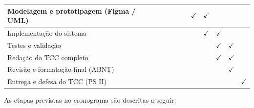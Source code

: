 \begin{table}[htb]
\begin{tabularx}{\textwidth}{|X|c|c|c|c|c|c|c|c|c|c|}
  Modelagem e prototipagem (Figma / UML)
  & & & & & & $\checkmark$ & $\checkmark$ & & & \\
  \hline

  Implementação do sistema
  & & & & & & & $\checkmark$ & $\checkmark$ & & \\
  \hline

  Testes e validação
  & & & & & & & & $\checkmark$ & $\checkmark$ & \\
  \hline


  Redação do TCC completo
  & & & & & & & & $\checkmark$ & $\checkmark$ & \\
  \hline

  Revisão e formatação final (ABNT)
  & & & & & & & & & $\checkmark$ & \\
  \hline

  Entrega e defesa do TCC (PS II)
  & & & & & & & & & & $\checkmark$ \\
  \hline

\end{tabularx}
\end{table}


As etapas previstas no cronograma são descritas a seguir:

